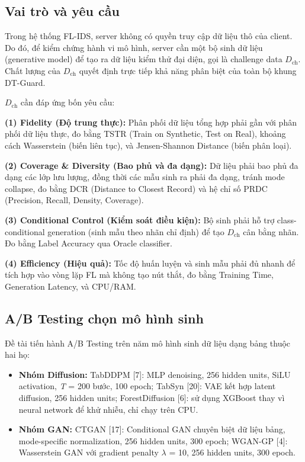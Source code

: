 \subsection{Vai trò và yêu cầu}
Trong hệ thống FL-IDS, server không có quyền truy cập dữ liệu thô của client. Do đó, để kiểm chứng hành vi mô hình, server cần một bộ sinh dữ liệu (generative model) để tạo ra dữ liệu kiểm thử đại diện, gọi là challenge data $D_{\text{ch}}$. Chất lượng của $D_{\text{ch}}$ quyết định trực tiếp khả năng phân biệt của toàn bộ khung DT-Guard.

$D_{\text{ch}}$ cần đáp ứng bốn yêu cầu:

\textbf{(1) Fidelity (Độ trung thực):} Phân phối dữ liệu tổng hợp phải gần với phân phối dữ liệu thực, đo bằng TSTR (Train on Synthetic, Test on Real), khoảng cách Wasserstein (biến liên tục), và Jensen-Shannon Distance (biến phân loại).

\textbf{(2) Coverage \& Diversity (Bao phủ và đa dạng):} Dữ liệu phải bao phủ đa dạng các lớp lưu lượng, đồng thời các mẫu sinh ra phải đa dạng, tránh mode collapse, đo bằng DCR (Distance to Closest Record) và hệ chỉ số PRDC (Precision, Recall, Density, Coverage).

\textbf{(3) Conditional Control (Kiểm soát điều kiện):} Bộ sinh phải hỗ trợ class-conditional generation (sinh mẫu theo nhãn chỉ định) để tạo $D_{\text{ch}}$ cân bằng nhãn. Đo bằng Label Accuracy qua Oracle classifier.

\textbf{(4) Efficiency (Hiệu quả):} Tốc độ huấn luyện và sinh mẫu phải đủ nhanh để tích hợp vào vòng lặp FL mà không tạo nút thắt, đo bằng Training Time, Generation Latency, và CPU/RAM.

\subsection{A/B Testing chọn mô hình sinh}
Đề tài tiến hành A/B Testing trên năm mô hình sinh dữ liệu dạng bảng thuộc hai họ:

\begin{itemize}
\item
  \textbf{Nhóm Diffusion:} TabDDPM {[}7{]}: MLP denoising, 256 hidden units, SiLU activation, \emph{T} = 200 bước, 100 epoch; TabSyn {[}20{]}: VAE kết hợp latent diffusion, 256 hidden units; ForestDiffusion {[}6{]}: sử dụng XGBoost thay vì neural network để khử nhiễu, chỉ chạy trên CPU.
\item
  \textbf{Nhóm GAN:} CTGAN {[}17{]}: Conditional GAN chuyên biệt dữ liệu bảng, mode-specific normalization, 256 hidden units, 300 epoch; WGAN-GP {[}4{]}: Wasserstein GAN với gradient penalty $\lambda$ = 10, 256 hidden units, 300 epoch.
\end{itemize}

